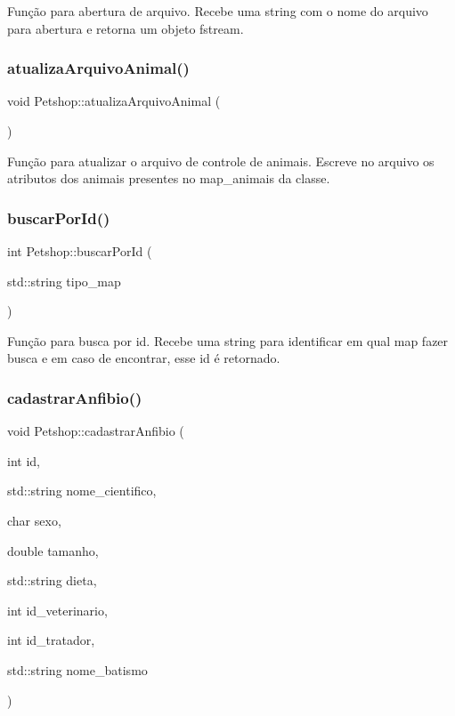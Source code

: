 Função para abertura de arquivo. Recebe uma string com o nome do arquivo para abertura e retorna um objeto fstream. \mbox{\label{classPetshop_a24cfb15a9aed53e6aea5f5faf6e202b2}} 
\subsubsection{\texorpdfstring{atualiza\+Arquivo\+Animal()}{atualizaArquivoAnimal()}}
{\footnotesize\ttfamily void Petshop\+::atualiza\+Arquivo\+Animal (\begin{DoxyParamCaption}{ }\end{DoxyParamCaption})}

Função para atualizar o arquivo de controle de animais. Escreve no arquivo os atributos dos animais presentes no map\+\_\+animais da classe. \mbox{\label{classPetshop_ae36b7c1babae414e65a2d22593005494}} 
\subsubsection{\texorpdfstring{buscar\+Por\+Id()}{buscarPorId()}}
{\footnotesize\ttfamily int Petshop\+::buscar\+Por\+Id (\begin{DoxyParamCaption}\item[{std\+::string}]{tipo\+\_\+map }\end{DoxyParamCaption})}

Função para busca por id. Recebe uma string para identificar em qual map fazer busca e em caso de encontrar, esse id é retornado. \mbox{\label{classPetshop_abe75c19422842cbb74163813bc99743b}} 
\subsubsection{\texorpdfstring{cadastrar\+Anfibio()}{cadastrarAnfibio()}}
{\footnotesize\ttfamily void Petshop\+::cadastrar\+Anfibio (\begin{DoxyParamCaption}\item[{int}]{id,  }\item[{std\+::string}]{nome\+\_\+cientifico,  }\item[{char}]{sexo,  }\item[{double}]{tamanho,  }\item[{std\+::string}]{dieta,  }\item[{int}]{id\+\_\+veterinario,  }\item[{int}]{id\+\_\+tratador,  }\item[{std\+::string}]{nome\+\_\+batismo }\end{DoxyParamCaption})}

